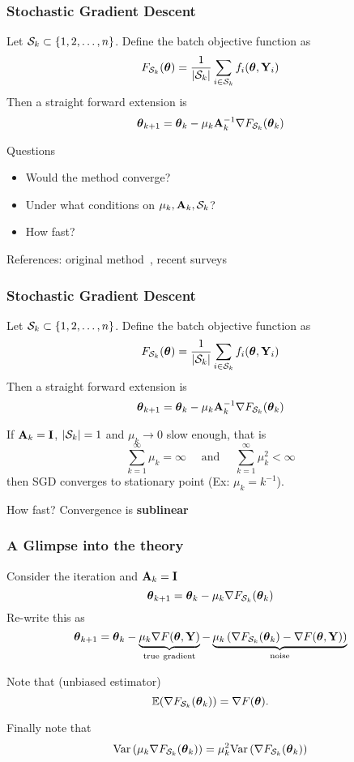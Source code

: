 \documentclass[12pt,fleqn,beamer]{beamer}
\begin{document}
\begin{frame}[fragile]\frametitle{Stochastic Gradient Descent}

Let ${\cal S}_k \subset \{1,2,\ldots,n\}$. Define the batch objective function as 
$$ F_{{\cal S}_k}({\boldsymbol \theta}) = \frac{1}{|{\cal S}_k|} \sum_{i \in {\cal S}_k} f_i({\boldsymbol \theta},{\bf Y}_i) $$
Then a straight forward extension  is
$$ {\boldsymbol \theta}_{k+1} = {\boldsymbol \theta}_k - \mu_k {\bf A}_k^{-1}  \nabla F_{{\cal S}_k}({\boldsymbol \theta}_k) $$


Questions
\begin{itemize}
\item Would the method converge?
\item Under what conditions on $\mu_k,{\bf A}_k,{\cal S}_k$?
\item How fast?
\end{itemize}

References: original method~\cite{RobbinsMonro1951}, recent surveys~\cite{Bottou2012,Bertsekas2015,bottou2016optimization}
\end{frame}

\begin{frame}[fragile]\frametitle{Stochastic Gradient Descent}

Let ${\cal S}_k \subset \{1,2,\ldots,n\}$. Define the batch objective function as 
$$ F_{{\cal S}_k}({\boldsymbol \theta}) = \frac{1}{|{\cal S}_k|} \sum_{i \in {\cal S}_k} f_i({\boldsymbol \theta},{\bf Y}_i) $$
Then a straight forward extension   is
$$ {\boldsymbol \theta}_{k+1} = {\boldsymbol \theta}_k - \mu_k {\bf A}_k^{-1}  \nabla F_{{\cal S}_k}({\boldsymbol \theta}_k) $$

\bigskip
\pause

If ${\bf A}_k = {\bf I}$, $|{\cal S}_k|=1$ and $\mu_k \rightarrow 0$ slow enough, that is
$$ \sum_{k=1}^{\infty} \mu_k= \infty \quad \text{ and } \quad \sum_{k=1}^{\infty} \mu_k^2 < \infty$$
then SGD converges to stationary point \pause (Ex: $\mu_k = k^{-1}$).

\bigskip
\pause

How fast? Convergence is {\bf sublinear}

\end{frame}


\begin{frame}\frametitle{A Glimpse into the theory}
	Consider the iteration and ${\bf A}_k={\bf I}$
	$$ 
	{\boldsymbol \theta}_{k+1} = {\boldsymbol \theta}_k - \mu_k  \nabla F_{{\cal S}_k}({\boldsymbol \theta}_k) 
	$$
	\pause
	Re-write this as
	$$ 
	{\boldsymbol \theta}_{k+1} = {\boldsymbol \theta}_k - \underbrace{\mu_k \nabla F({\boldsymbol \theta},{\bf Y})}_{\rm true\ gradient} -  \underbrace{\mu_k \left ( \nabla F_{{\cal S}_k}({\boldsymbol \theta}_k)  - \nabla F ({\boldsymbol \theta},{\bf Y})\right)}_{\rm noise}
	$$
	
	\pause
	
	Note that (unbiased estimator)
	$$
	 {\mathbb{E}} (\nabla F_{{\cal S}_k}({\boldsymbol \theta}_k)) = \nabla F ({\boldsymbol \theta}).
	$$
	
	\pause
	
	Finally note that
	$$
		{\rm Var}\left( \mu_k \nabla F_{{\cal S}_k}({\boldsymbol \theta}_k) \right) = \mu_k^2 {\rm Var}\left( \nabla F_{{\cal S}_k}({\boldsymbol \theta}_k) \right)
	$$
\end{frame}
\end{document}
